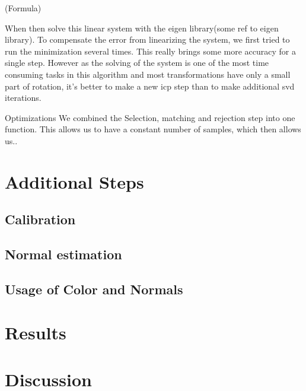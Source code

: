 \documentclass[twocolumn]{article}
\begin{document}
(Formula)

\cite{ptp}

When then solve this linear system with the eigen library(some ref to eigen library).
To compensate the error from linearizing the system, we first tried to run the minimization several times. 
This really brings some more accuracy for a single step. 
However as the solving of the system is one of the most time consuming tasks in this algorithm and most transformations have only a small part of rotation, it's better to make a new icp step than to make additional svd iterations.

Optimizations
We combined the Selection, matching and rejection step into one function. This allows us to have a constant number of samples, which then allows us..

\section{Additional Steps}
\subsection{Calibration}

\subsection{Normal estimation}

\subsection{Usage of Color and Normals}

\section{Results}

\section{Discussion}
\end{document}
